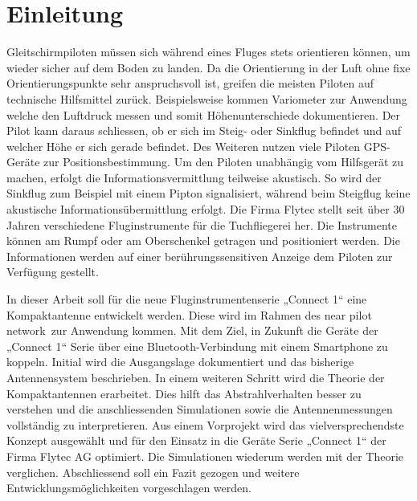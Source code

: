 \newpage
\section{Einleitung}
Gleitschirmpiloten müssen sich während eines Fluges stets orientieren können, um wieder sicher auf dem Boden zu landen. Da die Orientierung in der Luft ohne fixe Orientierungspunkte sehr anspruchsvoll ist, greifen die meisten Piloten auf technische Hilfsmittel zurück. Beispielsweise kommen Variometer zur Anwendung welche den Luftdruck messen und somit Höhenunterschiede dokumentieren. Der Pilot kann daraus schliessen, ob er sich im Steig- oder Sinkflug befindet und auf welcher Höhe er sich gerade befindet. Des Weiteren nutzen viele Piloten GPS-Geräte zur Positionsbestimmung. Um den Piloten unabhängig vom Hilfsgerät zu machen, erfolgt die Informationsvermittlung teilweise akustisch. So wird der Sinkflug zum Beispiel mit einem Pipton signalisiert, während beim Steigflug keine akustische Informationsübermittlung erfolgt. Die Firma Flytec stellt seit über 30 Jahren verschiedene Fluginstrumente für die Tuchfliegerei her. Die Instrumente können am Rumpf oder am Oberschenkel getragen und positioniert werden. Die Informationen werden auf einer berührungssensitiven Anzeige dem Piloten zur Verfügung gestellt. 

In dieser Arbeit soll für die neue Fluginstrumentenserie „Connect 1“ eine Kompaktantenne entwickelt werden. Diese wird im Rahmen des \glqq near pilot network\grqq \ zur Anwendung kommen. Mit dem Ziel, in Zukunft die Geräte der „Connect 1“ Serie über eine Bluetooth-Verbindung mit einem Smartphone zu koppeln. Initial wird die Ausgangslage dokumentiert und das bisherige Antennensystem beschrieben. In einem weiteren Schritt wird die Theorie der Kompaktantennen erarbeitet. Dies hilft das Abstrahlverhalten besser zu verstehen und die anschliessenden Simulationen sowie die Antennenmessungen vollständig zu interpretieren. Aus einem Vorprojekt wird das vielversprechendste Konzept ausgewählt und für den Einsatz in die Geräte Serie „Connect 1“ der Firma Flytec AG optimiert. Die Simulationen wiederum werden mit der Theorie verglichen. Abschliessend soll ein Fazit gezogen und weitere Entwicklungsmöglichkeiten vorgeschlagen werden.





